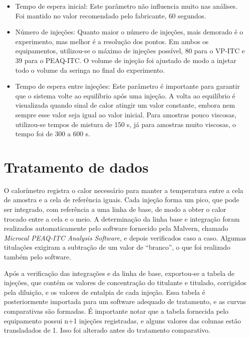 \begin{itemize}[noitemsep]
			\item Tempo de espera inicial: Este parâmetro não influencia muito nas análises. Foi mantido no valor recomendado pelo fabricante, 60 segundos.
			
			\item Número de injeções: Quanto maior o número de injeções, mais demorado é o experimento, mas melhor é a resolução dos pontos. Em ambos os equipamentos, utilizou-se o máximo de injeções possível, 80 para o VP-ITC e 39 para o PEAQ-ITC. O volume de injeção foi ajustado de modo a injetar todo o volume da seringa no final do experimento.
			
			\item Tempo de espera entre injeções: Este parâmetro é importante para garantir que o sistema volte ao equilíbrio após uma injeção. A volta ao equilíbrio é visualizada quando sinal de calor atingir um valor constante, embora nem sempre esse valor seja igual ao valor inicial. Para amostras pouco viscosas, utilizou-se tempos de mistura de 150 s, já para amostras muito viscosas, o tempo foi de 300 a 600 s.
		\end{itemize}
	
				
		\section{Tratamento de dados}
		
		O calorímetro registra o calor necessário para manter a temperatura entre a cela de amostra e a cela de referência iguais. Cada injeção forma um pico, que pode ser integrado, com referência a uma linha de base, de modo a obter o calor trocado entre a cela e o meio. A determinação da linha base e integração foram realizados automaticamente pelo software fornecido pela Malvern, chamado \emph{Microcal PEAQ-ITC Analysis Software}, e depois verificados caso a caso. Algumas titulações exigiram a subtração de um valor de ``branco'', o que foi realizado também pelo software.
		
		Após a verificação das integrações e da linha de base, exportou-se a tabela de injeções, que contém os valores de concentração do titulante e titulado, corrigidos pela diluição, e os valores de entalpia de cada injeção. Essa tabela é posteriormente importada para um software adequado de tratamento, e as curvas comparativas são formadas. É importante notar que a tabela fornecida pelo equipamento possui n+1 injeções registradas, e alguns valores das colunas estão transladados de 1. Isso foi alterado antes do tratamento comparativo.
		
